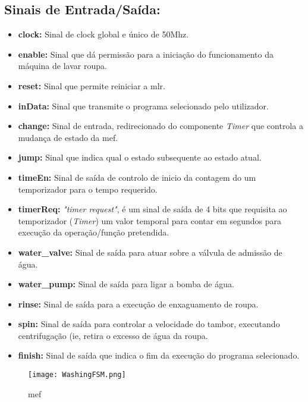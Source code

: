 \subsection{Sinais de Entrada/Saída:} 
\label{sec.IO_FSM}
\begin{itemize}

	\item\textbf{clock:} Sinal de clock global e único de 50Mhz.
	\item\textbf{enable:} Sinal que dá permissão para a iniciação do funcionamento da máquina de lavar roupa.
	\item\textbf{reset:} Sinal que permite reiniciar a \acf{mlr}.	
	\item\textbf{inData:} Sinal que	transmite o programa selecionado pelo utilizador.
	\item\textbf{change:} Sinal de entrada, redirecionado do componente \textit{Timer} que controla a mudança de estado da \ac{mef}.
	\item\textbf{jump:} Sinal que indica qual o estado subsequente ao estado atual. 
	
	
	\item \textbf{timeEn:} Sinal de saída de controlo de inicio da contagem do um temporizador para o tempo requerido.	
		\item \textbf{timerReq:} \textit{"timer request"}, é um sinal de saída de 4 bits que requisita ao temporizador (\textit{Timer}) um valor temporal  para contar em segundos para execução da operação/função pretendida.
	\item\textbf{water\_valve:} Sinal de saída para atuar sobre a válvula de admissão de água.
	\item\textbf{water\_pump:} Sinal de saída para ligar a bomba de água.
	\item\textbf{rinse:} Sinal de saída para a execução de enxaguamento de roupa.
	\item\textbf{spin:} Sinal de saída para controlar a velocidade do tambor, executando centrifugação (ie, retira o excesso de água da roupa.
	\item\textbf{finish:} Sinal de saída que indica o fim da execução do programa selecionado.	 
	 
\end{itemize}

\begin{figure}[H]
	\centering
	\texttt{[image: WashingFSM.png]}
	\caption{\acf{mef} \\}
	\label{fig:WashingFSM}
\end{figure} 

